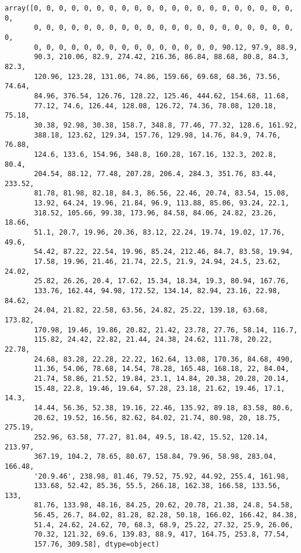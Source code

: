\documentclass[11pt]{article}
\makeatletter
\newcommand{\boxspacing}{\kern\kvtcb@left@rule\kern\kvtcb@boxsep}
\newcommand{\prompt}[4]{
        {\ttfamily\llap{{\color{#2}[#3]:\hspace{3pt}#4}}\vspace{-\baselineskip}}
    }
\makeatother
\begin{document}
            \begin{tcolorbox}[breakable, size=fbox, boxrule=.5pt, pad at break*=1mm, opacityfill=0]
\prompt{Out}{outcolor}{ }{\boxspacing}
\begin{Verbatim}[commandchars=\\\{\}]
array([0, 0, 0, 0, 0, 0, 0, 0, 0, 0, 0, 0, 0, 0, 0, 0, 0, 0, 0, 0, 0, 0,
       0, 0, 0, 0, 0, 0, 0, 0, 0, 0, 0, 0, 0, 0, 0, 0, 0, 0, 0, 0, 0, 0,
       0, 0, 0, 0, 0, 0, 0, 0, 0, 0, 0, 0, 0, 0, 0, 90.12, 97.9, 88.9,
       90.3, 210.06, 82.9, 274.42, 216.36, 86.84, 88.68, 80.8, 84.3, 82.3,
       120.96, 123.28, 131.06, 74.86, 159.66, 69.68, 68.36, 73.56, 74.64,
       84.96, 376.54, 126.76, 128.22, 125.46, 444.62, 154.68, 11.68,
       77.12, 74.6, 126.44, 128.08, 126.72, 74.36, 78.08, 120.18, 75.18,
       30.38, 92.98, 30.38, 158.7, 348.8, 77.46, 77.32, 128.6, 161.92,
       388.18, 123.62, 129.34, 157.76, 129.98, 14.76, 84.9, 74.76, 76.88,
       124.6, 133.6, 154.96, 348.8, 160.28, 167.16, 132.3, 202.8, 80.4,
       204.54, 88.12, 77.48, 207.28, 206.4, 284.3, 351.76, 83.44, 233.52,
       81.78, 81.98, 82.18, 84.3, 86.56, 22.46, 20.74, 83.54, 15.08,
       13.92, 64.24, 19.96, 21.84, 96.9, 113.88, 85.06, 93.24, 22.1,
       318.52, 105.66, 99.38, 173.96, 84.58, 84.06, 24.82, 23.26, 18.66,
       51.1, 20.7, 19.96, 20.36, 83.12, 22.24, 19.74, 19.02, 17.76, 49.6,
       54.42, 87.22, 22.54, 19.96, 85.24, 212.46, 84.7, 83.58, 19.94,
       17.58, 19.96, 21.46, 21.74, 22.5, 21.9, 24.94, 24.5, 23.62, 24.02,
       25.82, 26.26, 20.4, 17.62, 15.34, 18.34, 19.3, 80.94, 167.76,
       133.76, 162.44, 94.98, 172.52, 134.14, 82.94, 23.16, 22.98, 84.62,
       24.04, 21.82, 22.58, 63.56, 24.82, 25.22, 139.18, 63.68, 173.82,
       170.98, 19.46, 19.86, 20.82, 21.42, 23.78, 27.76, 58.14, 116.7,
       115.82, 24.42, 22.82, 21.44, 24.38, 24.62, 111.78, 20.22, 22.78,
       24.68, 83.28, 22.28, 22.22, 162.64, 13.08, 170.36, 84.68, 490,
       11.36, 54.06, 78.68, 14.54, 78.28, 165.48, 168.18, 22, 84.04,
       21.74, 58.86, 21.52, 19.84, 23.1, 14.84, 20.38, 20.28, 20.14,
       15.48, 22.8, 19.46, 19.64, 57.28, 23.18, 21.62, 19.46, 17.1, 14.3,
       14.44, 56.36, 52.38, 19.16, 22.46, 135.92, 89.18, 83.58, 80.6,
       20.62, 19.52, 16.56, 82.62, 84.02, 21.74, 80.98, 20, 18.75, 275.19,
       252.96, 63.58, 77.27, 81.04, 49.5, 18.42, 15.52, 120.14, 213.97,
       367.19, 104.2, 78.65, 80.67, 158.84, 79.96, 58.98, 283.04, 166.48,
       '20.9.46', 238.98, 81.46, 79.52, 75.92, 44.92, 255.4, 161.98,
       133.68, 52.42, 85.36, 55.5, 266.18, 162.38, 166.58, 133.56, 133,
       81.76, 133.98, 48.16, 84.25, 20.62, 20.78, 21.38, 24.8, 54.58,
       56.45, 26.7, 84.02, 81.28, 82.28, 50.18, 166.02, 166.42, 84.38,
       51.4, 24.62, 24.62, 70, 68.3, 68.9, 25.22, 27.32, 25.9, 26.06,
       70.32, 121.32, 69.6, 139.83, 88.9, 417, 164.75, 253.8, 77.54,
       157.76, 309.58], dtype=object)
\end{Verbatim}
\end{tcolorbox}
        
\end{document}
